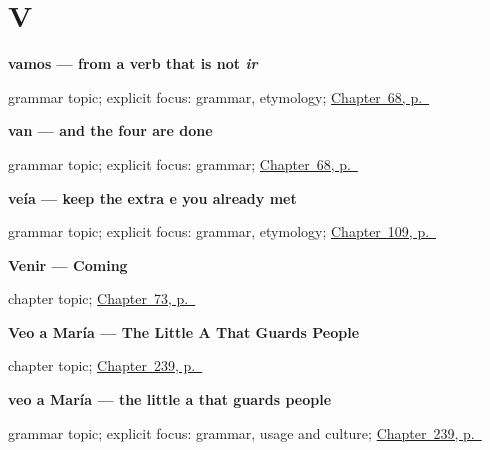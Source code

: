 \section*{V}

\noindent\begin{minipage}[t]{\linewidth}
\raggedright
\textbf{vamos — from a verb that is not \emph{ir}}\par
\footnotesize grammar topic; explicit focus: grammar, etymology; \hyperref[ch:spanish-ir-plural]{Chapter~68, p.~\pageref*{ch:spanish-ir-plural}}
\end{minipage}\par\smallskip

\noindent\begin{minipage}[t]{\linewidth}
\raggedright
\textbf{van — and the four are done}\par
\footnotesize grammar topic; explicit focus: grammar; \hyperref[ch:spanish-ir-plural]{Chapter~68, p.~\pageref*{ch:spanish-ir-plural}}
\end{minipage}\par\smallskip

\noindent\begin{minipage}[t]{\linewidth}
\raggedright
\textbf{veía — keep the extra e you already met}\par
\footnotesize grammar topic; explicit focus: grammar, etymology; \hyperref[ch:spanish-imperfecto-irregulares]{Chapter~109, p.~\pageref*{ch:spanish-imperfecto-irregulares}}
\end{minipage}\par\smallskip

\noindent\begin{minipage}[t]{\linewidth}
\raggedright
\textbf{Venir --- Coming}\par
\footnotesize chapter topic; \hyperref[ch:spanish-venir]{Chapter~73, p.~\pageref*{ch:spanish-venir}}
\end{minipage}\par\smallskip

\noindent\begin{minipage}[t]{\linewidth}
\raggedright
\textbf{Veo a María --- The Little A That Guards People}\par
\footnotesize chapter topic; \hyperref[ch:veo-a-maria]{Chapter~239, p.~\pageref*{ch:veo-a-maria}}
\end{minipage}\par\smallskip

\noindent\begin{minipage}[t]{\linewidth}
\raggedright
\textbf{veo a María — the little a that guards people}\par
\footnotesize grammar topic; explicit focus: grammar, usage and culture; \hyperref[ch:veo-a-maria]{Chapter~239, p.~\pageref*{ch:veo-a-maria}}
\end{minipage}\par\smallskip


